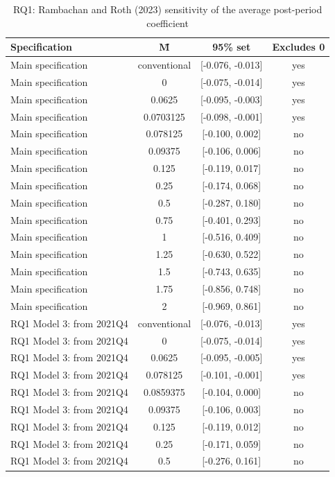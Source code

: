 \begin{table}[htbp]\centering
\caption{RQ1: Rambachan and Roth (2023) sensitivity of the average post-period coefficient}
\begin{tabular}{lccc}
\toprule
Specification & M̄ & 95\% set & Excludes 0 \\
\midrule
Main specification & conventional & [-0.076, -0.013] & yes \\
Main specification & 0 & [-0.075, -0.014] & yes \\
Main specification & 0.0625 & [-0.095, -0.003] & yes \\
Main specification & 0.0703125 & [-0.098, -0.001] & yes \\
Main specification & 0.078125 & [-0.100, 0.002] & no \\
Main specification & 0.09375 & [-0.106, 0.006] & no \\
Main specification & 0.125 & [-0.119, 0.017] & no \\
Main specification & 0.25 & [-0.174, 0.068] & no \\
Main specification & 0.5 & [-0.287, 0.180] & no \\
Main specification & 0.75 & [-0.401, 0.293] & no \\
Main specification & 1 & [-0.516, 0.409] & no \\
Main specification & 1.25 & [-0.630, 0.522] & no \\
Main specification & 1.5 & [-0.743, 0.635] & no \\
Main specification & 1.75 & [-0.856, 0.748] & no \\
Main specification & 2 & [-0.969, 0.861] & no \\
RQ1 Model 3: from 2021Q4 & conventional & [-0.076, -0.013] & yes \\
RQ1 Model 3: from 2021Q4 & 0 & [-0.075, -0.014] & yes \\
RQ1 Model 3: from 2021Q4 & 0.0625 & [-0.095, -0.005] & yes \\
RQ1 Model 3: from 2021Q4 & 0.078125 & [-0.101, -0.001] & yes \\
RQ1 Model 3: from 2021Q4 & 0.0859375 & [-0.104, 0.000] & no \\
RQ1 Model 3: from 2021Q4 & 0.09375 & [-0.106, 0.003] & no \\
RQ1 Model 3: from 2021Q4 & 0.125 & [-0.119, 0.012] & no \\
RQ1 Model 3: from 2021Q4 & 0.25 & [-0.171, 0.059] & no \\
RQ1 Model 3: from 2021Q4 & 0.5 & [-0.276, 0.161] & no \\

\end{tabular}
\end{table}
